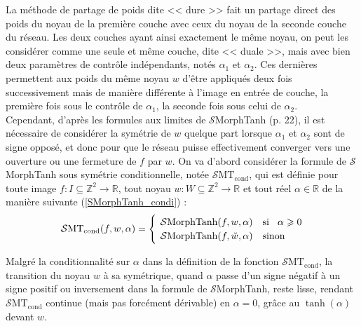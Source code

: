 La méthode de partage de poids dite << dure >> fait un partage direct des poids du noyau de la première couche avec ceux du noyau de la seconde couche du réseau. Les deux couches ayant ainsi exactement le même noyau, on peut les considérer comme une seule et même couche, dite << duale >>, mais avec bien deux paramètres de contrôle indépendants, notés $\alpha_1$ et $\alpha_2$. 
Ces dernières permettent aux poids du même noyau $w$ d'être appliqués deux fois successivement mais de manière différente à l'image en entrée de couche, la première fois sous le contrôle de $\alpha_1$, la seconde fois sous celui de $\alpha_2$. \\

\vspace{-1.6mm}
\noindent Cependant, d'après les formules aux limites de $\mathcal{S}$MorphTanh (p. 22), il est nécessaire de considérer la symétrie de $w$ quelque part lorsque $\alpha_1$ et $\alpha_2$ sont de signe opposé, et donc pour que le réseau puisse effectivement converger vers une ouverture ou une fermeture de $f$ par $w$. On va d'abord considérer la formule de $\mathcal{S}$MorphTanh sous symétrie conditionnelle, notée $\mathcal{S}\text{MT}_{\text{cond}}$, qui est définie pour toute image $f: I \subseteq \mathbb{Z}^2 \rightarrow \mathbb{R}$, tout noyau $w: W \subseteq \mathbb{Z}^2 \rightarrow \mathbb{R}$ et tout réel $\alpha \in \mathbb{R}$ de la manière suivante (\ref{SMorphTanh_condi}) : \\

\vspace{-5.0mm}
\begin{equation}
    \mathcal{S}\text{MT}_{\text{cond}} (f,w,\alpha) = 
    \begin{cases}
        \hspace{1.4mm} \mathcal{S}\text{MorphTanh} (f,w,\alpha) & \mbox{si} \hspace{3mm} \alpha \geqslant 0 \\
        \hspace{1.4mm} \mathcal{S}\text{MorphTanh} (f,\breve{w},\alpha) & \mbox{sinon}
    \end{cases}
    \label{SMorphTanh_condi}
\end{equation}

\vspace{2.5mm}
\noindent Malgré la conditionnalité sur $\alpha$ dans la définition de la fonction $\mathcal{S}\text{MT}_{\text{cond}}$, la transition du noyau $w$ à sa symétrique, quand $\alpha$ passe d'un signe négatif à un signe positif ou inversement dans la formule de $\mathcal{S}$MorphTanh, reste lisse, rendant $\mathcal{S}\text{MT}_{\text{cond}}$ continue (mais pas forcément dérivable) en $\alpha = 0$, grâce au $\tanh{(\alpha)}$ devant $w$. \\

